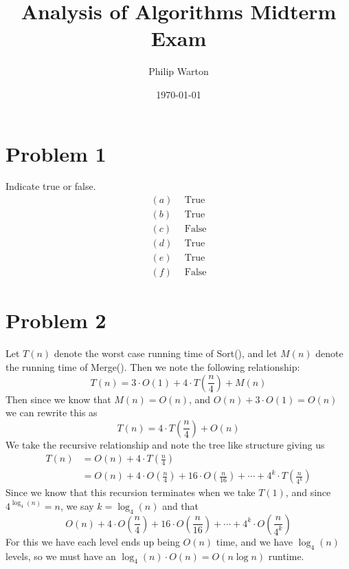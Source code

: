 \documentclass{article}
\begin{document}
\title{Analysis of Algorithms Midterm Exam}
\author{Philip Warton}
\date{\today}
\maketitle

\section*{Problem 1}
Indicate true or false.
\begin{align*}
    (a) & \ \ \text{True}\\
    (b) & \ \ \text{True}\\
    (c) & \ \ \text{False}\\
    (d) & \ \ \text{True}\\
    (e) & \ \ \text{True}\\
    (f) & \ \ \text{False}
\end{align*}

\section*{Problem 2}
Let $T(n)$ denote the worst case running time of Sort(), and let 
$M(n)$ denote the running time of Merge(). Then we note the following relationship:
\[
    T(n) = 3 \cdot O(1) + 4 \cdot T\left(\frac{n}{4}\right) + M(n)
\] 
Then since we know that $M(n) = O(n)$, and $O(n) + 3 \cdot O(1) = O(n)$ we can rewrite this as
\[
    T(n) = 4 \cdot T\left(\frac{n}{4}\right) + O(n)
\] 
We take the recursive relationship and note the tree like structure giving us 
\begin{align*} 
    T(n) &= O(n) + 4 \cdot T\left(\frac{n}{4}\right) \\
    &= O(n) + 4 \cdot O\left(\frac{n}{4}\right) + 16 \cdot O\left(\frac{n}{16}\right) + \cdots + 4^k \cdot T\left(\frac{n}{4^k}\right)
\end{align*}
Since we know that this recursion terminates when we take $T(1)$, and since $4^{\log_4(n)} = n$, we say
$k = \log_4(n)$ and that
\[
    O(n) + 4 \cdot O\left(\frac{n}{4}\right) + 16 \cdot O\left(\frac{n}{16}\right) + \cdots + 4^k \cdot O\left(\frac{n}{4^k}\right)
\]
For this we have each level ends up being $O(n)$ time, and we have $\log_4(n)$ levels,
so we must have an $\log_4(n) \cdot O(n) = O(n \log n)$ runtime.
\end{document}
